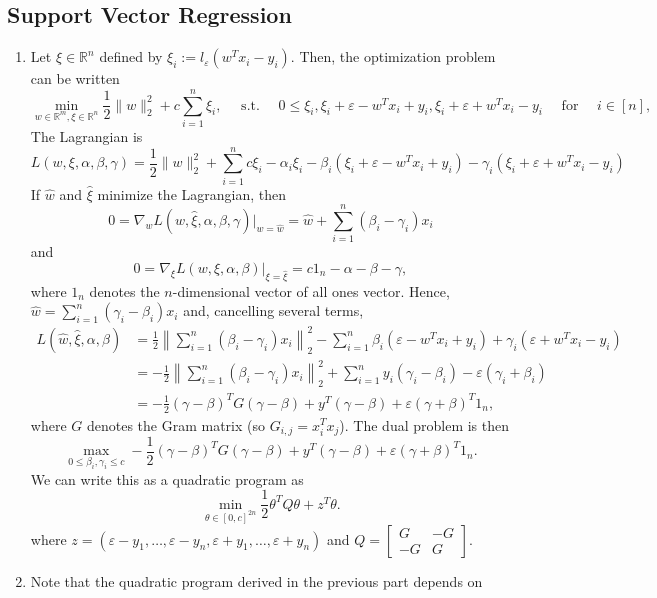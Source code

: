 \documentclass[11pt]{article}
\newcommand{\R}{\mathbb{R}} %
\newcommand{\e}{\varepsilon} %
\begin{document}
\subsection{Support Vector Regression}
\begin{enumerate}
\item Let $\xi \in \R^n$ defined by $\xi_i := l_\e(w^Tx_i - y_i)$. Then, the
optimization problem can be written
\[\min_{w \in \R^m, \xi \in \R^n}
    \frac12 \|w\|_2^2 + c \sum_{i = 1}^n \xi_i,
    \quad \mbox{ s.t. } \quad
    0 \leq \xi_i, \xi_i + \e - w^Tx_i + y_i, \xi_i + \e + w^Tx_i - y_i
    \quad \mbox{ for } \quad
    i \in [n],
\]
The Lagrangian is
\[L(w,\xi,\alpha,\beta,\gamma)
    = \frac12 \|w\|_2^2 + \sum_{i = 1}^n c\xi_i - \alpha_i\xi_i
                        - \beta_i(\xi_i + \e - w^Tx_i + y_i)
                        - \gamma_i(\xi_i + \e + w^Tx_i - y_i)
\]
If $\hat w$ and $\hat \xi$ minimize the Lagrangian, then
\[0
    = \nabla_w L(w, \hat \xi,\alpha,\beta,\gamma) \big|_{w = \hat w}
    = \hat w + \sum_{i = 1}^n (\beta_i - \gamma_i) x_i
\]
and
\[0
    = \nabla_\xi L(w,\xi,\alpha,\beta) \big|_{\xi = \hat \xi}
    = c1_n - \alpha - \beta - \gamma,
\]
where $1_n$ denotes the $n$-dimensional vector of all ones vector. Hence,
$\hat w = \sum_{i = 1}^n (\gamma_i - \beta_i) x_i$ and, cancelling several
terms,
\begin{align*}
L(\hat w, \hat \xi, \alpha, \beta)
 &  = \frac12 \left\| \sum_{i = 1}^n (\beta_i - \gamma_i)x_i \right\|_2^2
        - \sum_{i = 1}^n
            \beta_i(\e - w^Tx_i + y_i) + \gamma_i(\e + w^Tx_i - y_i)   \\
 &  = -\frac12 \left\| \sum_{i = 1}^n (\beta_i - \gamma_i)x_i \right\|_2^2
        + \sum_{i = 1}^n y_i(\gamma_i - \beta_i) - \e(\gamma_i + \beta_i)   \\
 &  = -\frac12 (\gamma - \beta)^TG(\gamma - \beta)
    + y^T(\gamma - \beta) + \e(\gamma + \beta)^T1_n,
\end{align*}
where $G$ denotes the Gram matrix (so $G_{i,j} = x_i^Tx_j$).
The dual problem is then
\[\max_{0 \leq \beta_i,\gamma_i \leq c}
    -\frac12 (\gamma - \beta)^TG(\gamma - \beta)
    + y^T(\gamma - \beta) + \e(\gamma + \beta)^T1_n.
\]
We can write this as a quadratic program as
\[\min_{\theta \in [0,c]^{2n}} \frac12 \theta^T Q \theta + z^T \theta.\]
where $z = (\e - y_1,\dots,\e - y_n,\e + y_1,\dots,\e + y_n)$ and
$Q =
\begin{bmatrix}
  G     & -G    \\
  -G    & G
\end{bmatrix}$.
\item Note that the quadratic program derived in the previous part depends on

\end{enumerate}
\end{document}

